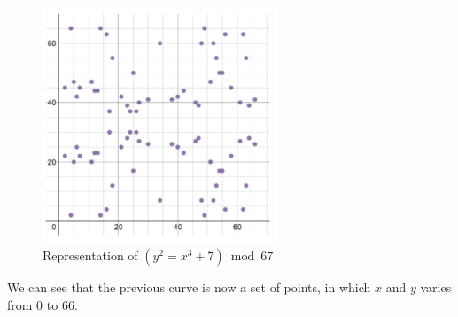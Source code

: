 \documentclass{article}
\begin{document}
\begin{figure}[H]
    \centering
    \includegraphics[width=7cm]{images/5.png}
    \caption{Representation of \((y^2 = x^3 + 7) \bmod 67\)}
\end{figure}

\noindent We can see that the previous curve is now a set of points, in which \(x\) and \(y\) varies from \(0\) to \(66\).
\clearpage
\end{document}
